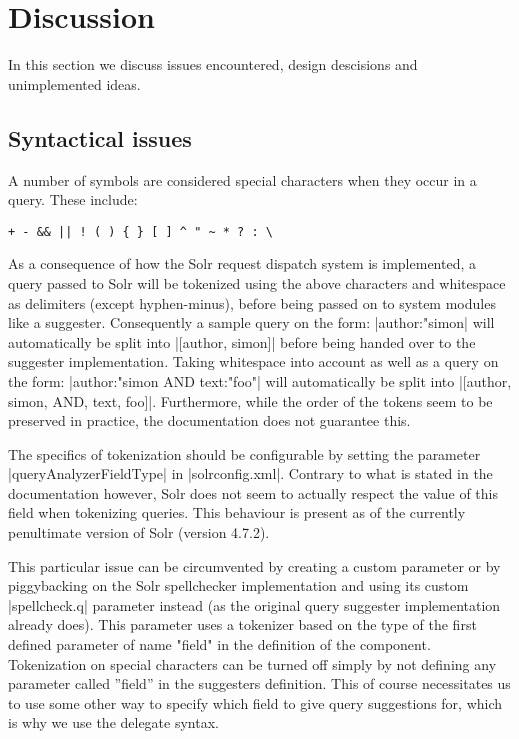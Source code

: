 \section{Discussion}\label{discussion}

In this section we discuss issues encountered, design descisions and unimplemented ideas.

\subsection{Syntactical issues}

A number of symbols are considered special characters when they occur in a query. These include\cite{QUERY}:
\begin{verbatim}
+ - && || ! ( ) { } [ ] ^ " ~ * ? : \
\end{verbatim}

As a consequence of how the Solr request dispatch system is implemented, a query passed to Solr will be tokenized using the above characters and whitespace as delimiters (except hyphen-minus), before being passed on to system modules like a suggester.
Consequently a sample query on the form: |author:"simon| will automatically be split into |[author, simon]|
before being handed over to the suggester implementation.
Taking whitespace into account as well as a query on the form: |author:"simon AND text:"foo"| will automatically be split into |[author, simon, AND, text, foo]|.
Furthermore, while the order of the tokens seem to be preserved in practice, the documentation does not guarantee this.

The specifics of tokenization should be configurable by setting the parameter |queryAnalyzerFieldType| in |solrconfig.xml|. Contrary to what is stated in the documentation however, Solr does not seem to actually respect the value of this field when tokenizing queries. This behaviour is present as of the currently penultimate version of Solr (version 4.7.2).

This particular issue can be circumvented by creating a custom parameter or by piggybacking on the Solr spellchecker implementation and using its custom |spellcheck.q| parameter instead (as the original query suggester implementation already does).
This parameter uses a tokenizer based on the type of the first defined parameter of name "field" in the definition of the component.\cite{FIELDTYPE}
Tokenization on special characters can be turned off simply by not defining any parameter called ''field'' in the suggesters definition. This of course necessitates us to use some other way to specify which field to give query suggestions for, which is why we use the delegate syntax.

